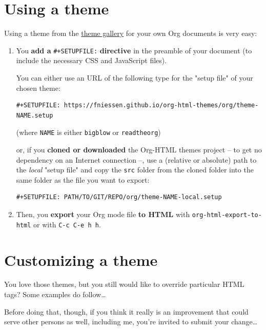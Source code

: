 \documentclass[11pt]{article}
\begin{document}
\section{Using a theme}
\label{sec:org6638272}

Using a theme from the \hyperref[sec:org5fdcf56]{theme gallery} for your own Org documents is very easy:

\begin{enumerate}
\item You \textbf{add a} \texttt{\#+SETUPFILE:} \textbf{directive} in the preamble of your document (to include
the necessary CSS and JavaScript files).

You can either use an URL of the following type for the "setup file" of your
chosen theme:

\begin{verbatim}
#+SETUPFILE: https://fniessen.github.io/org-html-themes/org/theme-NAME.setup
\end{verbatim}

(where \texttt{NAME} is either \texttt{bigblow} or \texttt{readtheorg})

or, if you \textbf{cloned or downloaded} the Org-HTML themes project -- to get no
dependency on an Internet connection --, use a (relative or absolute) path to
the \emph{local} "setup file" and copy the \texttt{src} folder from the cloned folder
into the same folder as the file you want to export:

\begin{verbatim}
#+SETUPFILE: PATH/TO/GIT/REPO/org/theme-NAME-local.setup
\end{verbatim}

\item Then, you \textbf{export} your Org mode file \textbf{to HTML} with \texttt{org-html-export-to-html} or
with \texttt{C-c C-e h h}.
\end{enumerate}

\section{Customizing a theme}
\label{sec:org080523d}

You love those themes, but you still would like to override particular HTML
tags?  Some examples do follow\ldots{}

Before doing that, though, if you think it really is an improvement that could
serve other persons as well, including me, you're invited to submit your
change\ldots{}
\end{document}

